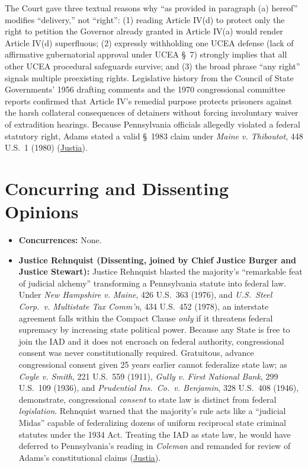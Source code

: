 \documentclass[12pt]{article}
\begin{document}
The Court gave three textual reasons why ``as provided in paragraph (a) hereof'' modifies ``delivery,'' not ``right'': (1) reading Article IV(d) to protect only the right to petition the Governor already granted in Article IV(a) would render Article IV(d) superfluous; (2) expressly withholding one UCEA defense (lack of affirmative gubernatorial approval under UCEA \S\ 7) strongly implies that all other UCEA procedural safeguards survive; and (3) the broad phrase ``any right'' signals multiple preexisting rights. Legislative history from the Council of State Governments' 1956 drafting comments and the 1970 congressional committee reports confirmed that Article IV's remedial purpose protects prisoners against the harsh collateral consequences of detainers without forcing involuntary waiver of extradition hearings. Because Pennsylvania officials allegedly violated a federal statutory right, Adams stated a valid \S\ 1983 claim under \textit{Maine v. Thiboutot}, 448 U.S.\ 1 (1980) (\href{https://supreme.justia.com/cases/federal/us/449/433/}{Justia}).

\section{Concurring and Dissenting Opinions}

\begin{itemize}
  \item \textbf{Concurrences:} None.
  \item \textbf{Justice Rehnquist (Dissenting, joined by Chief Justice Burger and Justice Stewart):} Justice Rehnquist blasted the majority's ``remarkable feat of judicial alchemy'' transforming a Pennsylvania statute into federal law. Under \textit{New Hampshire v. Maine}, 426 U.S.\ 363 (1976), and \textit{U.S.\ Steel Corp.\ v. Multistate Tax Comm'n}, 434 U.S.\ 452 (1978), an interstate agreement falls within the Compact Clause \textit{only} if it threatens federal supremacy by increasing state political power. Because any State is free to join the IAD and it does not encroach on federal authority, congressional consent was never constitutionally required. Gratuitous, advance congressional consent given 25 years earlier cannot federalize state law; as \textit{Coyle v. Smith}, 221 U.S.\ 559 (1911), \textit{Gully v. First National Bank}, 299 U.S.\ 109 (1936), and \textit{Prudential Ins.\ Co.\ v. Benjamin}, 328 U.S.\ 408 (1946), demonstrate, congressional \textit{consent} to state law is distinct from federal \textit{legislation}. Rehnquist warned that the majority's rule acts like a ``judicial Midas'' capable of federalizing dozens of uniform reciprocal state criminal statutes under the 1934 Act. Treating the IAD as state law, he would have deferred to Pennsylvania's reading in \textit{Coleman} and remanded for review of Adams's constitutional claims (\href{https://supreme.justia.com/cases/federal/us/449/433/}{Justia}).
\end{itemize}
\end{document}
